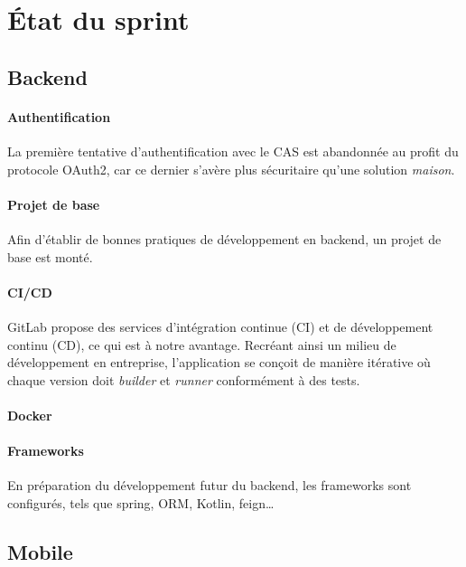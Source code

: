 \section{État du sprint}
	
	\subsection{Backend}

	\paragraph{Authentification} La première tentative d'authentification avec le CAS est abandonnée au profit du protocole OAuth2, car ce dernier s'avère plus sécuritaire qu'une solution \emph{maison}.
	
	\paragraph{Projet de base} Afin d'établir de bonnes pratiques de développement en backend, un projet de base est monté. %
	
	\paragraph{CI/CD} GitLab propose des services d'intégration continue (CI) et de développement continu (CD), ce qui est à notre avantage. Recréant ainsi un milieu de développement en entreprise, l'application se conçoit de manière itérative où chaque version doit \emph{builder} et \emph{runner} conformément à des tests.
	
	\paragraph{Docker} %
	
	
	\paragraph{Frameworks} En préparation du développement futur du backend, les frameworks sont configurés, tels que spring, ORM, Kotlin, feign\dots
		
	\subsection{Mobile}

